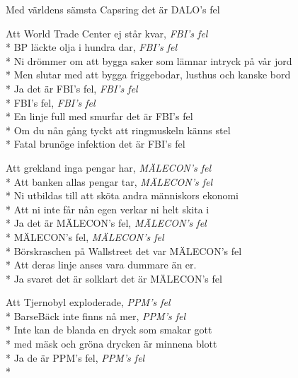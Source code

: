 \begin{SongText}
\begin{SongVerse}
        Med världens sämsta Capsring det är DALO's fel
    \end{SongVerse}
    \begin{SongVerse}
        Att World Trade Center ej står kvar, \textit{FBI's fel}\\*%
        BP läckte olja i hundra dar, \textit{FBI's fel}\\*%
        Ni drömmer om att bygga saker som lämnar intryck på vår jord\\*%
        Men slutar med att bygga friggebodar, lusthus och kanske bord\\*%
        Ja det är FBI's fel, \textit{FBI's fel}\\*%
        FBI's fel, \textit{FBI's fel}\\*%
        En linje full med smurfar det är FBI's fel\\*%
        Om du nån gång tyckt att ringmuskeln känns stel\\*%
        Fatal brunöge infektion det är FBI's fel
    \end{SongVerse}
    \begin{SongVerse}
        Att grekland inga pengar har, \textit{MÄLECON's fel}\\*%
        Att banken allas pengar tar, \textit{MÄLECON's fel}\\*%
        Ni utbildas till att sköta andra människors ekonomi\\*%
        Att ni inte får nån egen verkar ni helt skita i\\*%
        Ja det är MÄLECON's fel, \textit{MÄLECON's fel}\\*%
        MÄLECON's fel, \textit{MÄLECON's fel}\\*%
        Börskraschen på Wallstreet det var MÄLECON's fel\\*%
        Att deras linje anses vara dummare än er.\\*%
        Ja svaret det är solklart det är MÄLECON's fel
    \end{SongVerse}
    \begin{SongVerse}
        Att Tjernobyl exploderade, \textit{PPM's fel}\\*%
        BarseBäck inte finns nå mer, \textit{PPM's fel}\\*%
        Inte kan de blanda en dryck som smakar gott\\*%
        med mäsk och gröna drycken är minnena blott\\*%
        Ja de är PPM's fel, \textit{PPM's fel}\\*%

\end{SongVerse}
\end{SongText}
